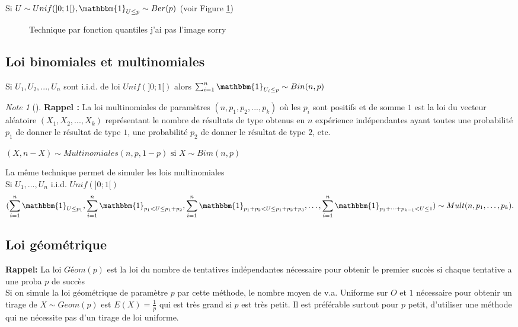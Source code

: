 \documentclass{article}
\theoremstyle{plain}%
\theoremstyle{definition}
\theoremstyle{remark}
\newtheorem*{note}{Note}
\begin{document}
Si $ U \sim Unif(]0;1[), \mathbbm{1}_{U \leq p} \sim Ber(p) $ 
(voir Figure \ref{fig5})
\begin{figure}[!htbp]
	\centering
	\caption{Technique par fonction quantiles j'ai pas l'image sorry}
	\label{fig5}
\end{figure}

\subsection{Loi binomiales et multinomiales}
Si $ U_1, U_2, ..., U_n $ sont i.i.d. de loi $ Unif(]0;1[) $ alors $ \sum_{i=1}^{n}\mathbbm{1}_{U_i \leq p} \sim Bin(n,p) $ 

\begin{note}[]
	\textbf{Rappel : } La loi multinomiales de paramètres $ (n,p_1, p_2, ..., p_k) $ où les $ p_i $ sont positifs et de somme $ 1 $ est la loi du vecteur aléatoire $ (X_1,X_2, ..., X_k) $ représentant le nombre de résultats de type obtenus en $ n $ expérience indépendantes ayant toutes une probabilité $ p_1 $ de donner le résultat de type $ 1 $, une probabilité $ p_2 $ de donner le résultat de type $ 2 $, etc.
	
	$ (X, n-X) \sim Multinomiales(n,p,1-p) \text{ si } X \sim Bim(n,p) $ 
\end{note}

La même technique permet de simuler les lois multinomiales \\ 
Si $ U_1, \dots, U_n $ i.i.d. $ Unif(]0;1[) $ 
\[
	(\sum_{i=1}^{n}\mathbbm{1}_{U \leq p_1}, \sum_{i=1}^{n}\mathbbm{1}_{p_1 < U \leq p_1 + p_2}, \sum_{i=1}^{n}\mathbbm{1}_{p_1 + p_2 < U \leq p_1 + p_2 + p_3}, \dots, \sum_{i=1}^{n}\mathbbm{1}_{p_1 + \dots + p _{k-1} < U \leq 1}) \sim Mult(n,p_1, \dots, p_k)
.\]

\subsection{Loi géométrique}

\textbf{Rappel:} La loi $ Géom(p) $ est la loi du nombre de tentatives indépendantes nécessaire pour obtenir le premier succès si chaque tentative a une proba $ p $ de succès \\

Si on simule la loi géométrique de paramètre $ p $ par cette méthode, le nombre moyen de v.a. Uniforme sur $ O $ et $ 1 $ nécessaire pour obtenir un tirage de $ X \sim Geom(p) $ est $ E(X) = \frac{1}{p} $ qui est très grand si $ p $  est très petit. Il est préférable surtout pour $ p $ petit, d'utiliser une méthode qui ne nécessite pas d'un tirage de loi uniforme.
\end{document}
